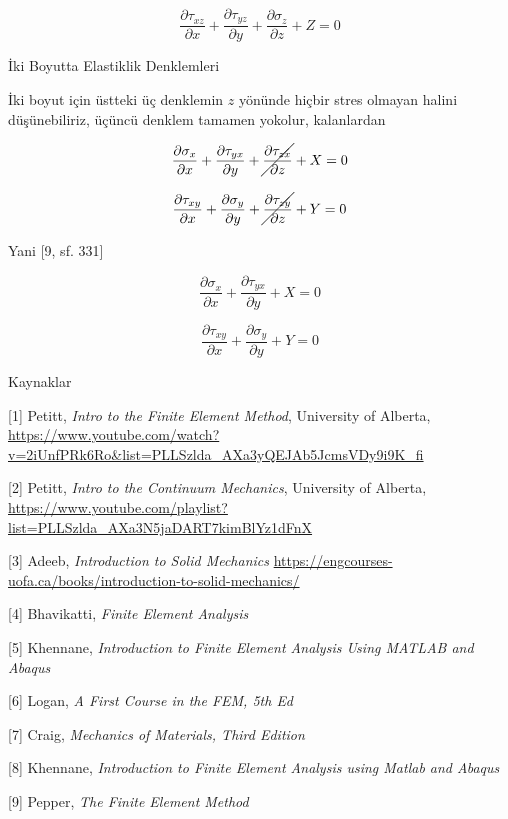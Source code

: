 \documentclass[12pt,fleqn]{article}\usepackage{../../common}
\begin{document}
$$
\frac{\partial \tau_{xz}}{\partial x} + 
\frac{\partial \tau_{yz}}{\partial y} + 
\frac{\partial \sigma_z}{\partial z} + Z = 0
$$

İki Boyutta Elastiklik Denklemleri

İki boyut için üstteki üç denklemin $z$ yönünde hiçbir stres olmayan halini
düşünebiliriz, üçüncü denklem tamamen yokolur, kalanlardan

$$
\frac{\partial \sigma_x}{\partial x} + 
\frac{\partial \tau_{yx}}{\partial y} + 
\cancel{\frac{\partial \tau_{zx}}{\partial z}} + X = 0
$$

$$
\frac{\partial \tau_{xy}}{\partial x} + 
\frac{\partial \sigma_y}{\partial y} + 
\cancel{\frac{\partial \tau_{zy}}{\partial z}} + Y = 0
$$

Yani [9, sf. 331]

$$
\frac{\partial \sigma_x}{\partial x} + 
\frac{\partial \tau_{yx}}{\partial y} + X = 0
$$

$$
\frac{\partial \tau_{xy}}{\partial x} + 
\frac{\partial \sigma_y}{\partial y} + Y = 0
$$

Kaynaklar

[1] Petitt, {\em Intro to the Finite Element Method}, University of Alberta,
    \url{https://www.youtube.com/watch?v=2iUnfPRk6Ro&list=PLLSzlda_AXa3yQEJAb5JcmsVDy9i9K_fi}

[2] Petitt, {\em Intro to the Continuum Mechanics}, University of Alberta,
    \url{https://www.youtube.com/playlist?list=PLLSzlda_AXa3N5jaDART7kimBlYz1dFnX}

[3] Adeeb, {\em Introduction to Solid Mechanics}
    \url{https://engcourses-uofa.ca/books/introduction-to-solid-mechanics/}

[4] Bhavikatti, {\em Finite Element Analysis}    
    
[5] Khennane, {\em Introduction to Finite Element Analysis Using MATLAB and Abaqus}

[6] Logan, {\em A First Course in the FEM, 5th Ed}

[7] Craig, {\em Mechanics of Materials, Third Edition}

[8] Khennane, {\em Introduction to Finite Element Analysis using Matlab and Abaqus}

[9] Pepper, {\em The Finite Element Method}
\end{document}
